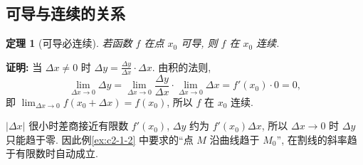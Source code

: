 \documentclass[UTF8,openany]{ctexbook}
\theoremstyle{chinesetextbook}
\newenvironment{cnproof}{\par\indent\textbf{证明:} \ignorespaces}{\par}
\newtheorem*{theoremsingle}{定理}
\begin{document}
\subsection{可导与连续的关系}
\begin{theoremsingle}[可导必连续]
若函数 $f$ 在点 $x_0$ 可导, 则 $f$ 在 $x_0$ 连续.
\end{theoremsingle}
\begin{cnproof}
当 $\Delta x\ne0$ 时 $\displaystyle\Delta y=\frac{\Delta y}{\Delta x}\cdot\Delta x$. 由积的法则,
\[
\lim_{\Delta x\to0}\Delta y=\lim_{\Delta x\to0}\frac{\Delta y}{\Delta x}\cdot\lim_{\Delta x\to0}\Delta x=f'(x_0)\cdot0=0,
\]
即 $\displaystyle\lim_{\Delta x\to0}f(x_0+\Delta x)=f(x_0)$, 所以 $f$ 在 $x_0$ 连续.
\end{cnproof}
$|\Delta x|$ 很小时差商接近有限数 $f'(x_0)$, $\Delta y$ 约为 $f'(x_0)\Delta x$, 所以 $\Delta x\to0$ 时 $\Delta y$ 只能趋于零. 因此例\ref{ex:c2-1-2} 中要求的“点 $M$ 沿曲线趋于 $M_0$”, 在割线的斜率趋于有限数时自动成立.
\end{document}
